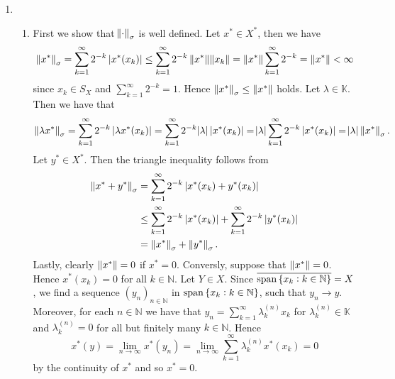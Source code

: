 \begin{enumerate}[label = \textbf{Exercise \arabic*.},wide = 0pt, itemsep = 1.5ex]
	\item 
		~
		\begin{enumerate}[label = \textbf{\alph*.},wide = 0pt, itemsep = 1.5ex]
			\item First we show that $\norm{\cdot}_\sigma$ is well defined. Let $x^* \in X^*$, then we have 
				\begin{equation*}
					\norm[0]{x^*}_\sigma = \sum_{k = 1}^\infty 2^{-k}\abs[0]{x^*(x_k)} \leq \sum_{k = 1}^\infty 2^{-k} \norm[0]{x^*} \norm{x_k} = \norm[0]{x^*}\sum_{k = 1}^\infty 2^{-k} = \norm[0]{x^*} < \infty
				\end{equation*}
				\noindent since $x_k \in S_X$ and $\sum_{k = 1}^\infty 2^{-k} = 1$. Hence $\norm[0]{x^*}_\sigma \leq \norm[0]{x^*}$ holds. Let $\lambda \in \mathbb{K}$. Then we have that
				\begin{equation*}
					\norm[0]{\lambda x^*}_\sigma = \sum_{k = 1}^\infty 2^{-k} \abs[0]{\lambda x^*(x_k)} = \sum_{k = 1}^\infty 2^{-k} \abs{\lambda} \abs[0]{x^*(x_k)} = \abs{\lambda} \sum_{k = 1}^\infty 2^{-k} \abs[0]{x^*(x_k)} = \abs{\lambda}\norm[0]{x^*}_\sigma.
				\end{equation*}
				Let $y^* \in X^*$. Then the triangle inequality follows from
				\begin{align*}
					\norm[0]{x^* + y^*}_\sigma &= \sum_{k = 1}^\infty 2^{-k}\abs[0]{x^*(x_k) + y^*(x_k)}\\
					&\leq \sum_{k = 1}^\infty 2^{-k}\abs[0]{x^*(x_k)} + \sum_{k = 1}^\infty 2^{-k}\abs[0]{y^*(x_k)}\\
					&= \norm[0]{x^*}_\sigma + \norm[0]{y^*}_\sigma.
				\end{align*}
				Lastly, clearly $\norm[0]{x^*} = 0$ if $x^* = 0$. Conversly, suppose that $\norm[0]{x^*} = 0$. Hence $x^*(x_k) = 0$ for all $k \in \mathbb{N}$. Let $Y \in X$. Since $\overline{\mathrm{span}\cbr[0]{x_k : k \in \mathbb{N}}} = X$, we find a sequence $(y_n)_{n \in \mathbb{N}}$ in $\mathrm{span}\cbr{x_k : k \in \mathbb{N}}$, such that $y_n \to y$. Moreover, for each $n \in \mathbb{N}$ we have that $y_n = \sum_{k = 1}^\infty \lambda^{(n)}_k x_k$ for $\lambda^{(n)}_k \in \mathbb{K}$ and $\lambda^{(n)}_k = 0$ for all but finitely many $k \in \mathbb{N}$. Hence
				\begin{equation*}
					x^*(y) = \lim_{n \to \infty}x^*(y_n) = \lim_{n \to \infty}\sum_{k = 1}^\infty \lambda^{(n)}_kx^*(x_k) = 0
				\end{equation*}
				\noindent by the continuity of $x^*$ and so $x^* = 0$.
		\end{enumerate}

\end{enumerate}
\printbibliography

